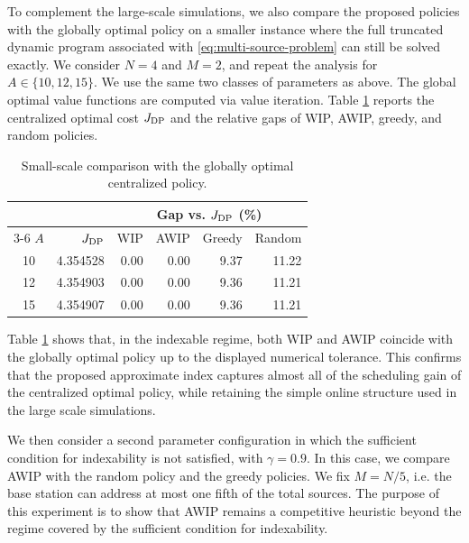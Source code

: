 \documentclass[letterpaper,journal]{IEEEtran}
\begin{document}
To complement the large-scale simulations, we also compare the proposed policies with the globally optimal policy on a smaller instance where the full truncated dynamic program associated with \eqref{eq:multi-source-problem} can still be solved exactly. We consider $N=4$ and $M=2$, and repeat the analysis for $A\in\{10,12,15\}$. We use the same two classes of parameters as above. The global optimal value functions are computed via value iteration. Table \ref{tab:exact-DP} reports the centralized optimal cost $J_{\rm DP}$ and the relative gaps of WIP, AWIP, greedy, and random policies.

\begin{table}[ht]
\centering
\caption{Small-scale comparison with the globally optimal centralized policy.}
\label{tab:exact-DP}
\scriptsize
\setlength{\tabcolsep}{3.5pt}
\begin{tabular}{crrrrr}
\toprule
& & \multicolumn{4}{c}{Gap vs. $J_{\rm DP}$ (\%)} \\
\cmidrule(lr){3-6}
$A$ & $J_{\rm DP}$ & WIP & AWIP & Greedy & Random \\
\midrule
10 & 4.354528 & 0.00 & 0.00 & 9.37 & 11.22 \\
12 & 4.354903 & 0.00 & 0.00 & 9.36 & 11.21 \\
15 & 4.354907 & 0.00 & 0.00 & 9.36 & 11.21 \\

\bottomrule
\end{tabular}
\vspace{1mm}
\begin{flushleft}
\end{flushleft}
\end{table}

Table \ref{tab:exact-DP} shows that, in the indexable regime, both WIP and AWIP coincide with the globally optimal policy up to the displayed numerical tolerance. This confirms that the proposed approximate index captures almost all of the scheduling gain of the centralized optimal policy, while retaining the simple online structure used in the large scale simulations.

We then consider a second parameter configuration in which the sufficient condition for indexability is not satisfied, with $\gamma=0.9$. In this case, we compare AWIP with the random policy and the greedy policies. We fix $M=N/5$, i.e. the base station can address at most one fifth of the total sources. The purpose of this experiment is to show that AWIP remains a competitive heuristic beyond the regime covered by the sufficient condition for indexability.
\end{document}
